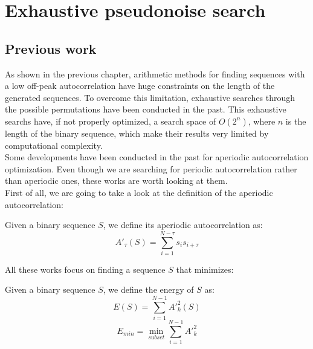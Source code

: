 \chapter{Exhaustive pseudonoise search}
  \section{Previous work}

  As shown in the previous chapter, arithmetic methods for finding sequences
  with a low off-peak autocorrelation have huge constraints on the length of
  the generated sequences. To overcome this limitation, exhaustive searches
  through the possible permutations have been conducted in the past. This
  exhaustive searchs have, if not properly optimized, a search space of
  $O(2^n)$, where $n$ is the length of the binary sequence, which make their
  results very limited by computational complexity.\\

  Some developments have been conducted in the past for aperiodic
  autocorrelation optimization. Even though we are searching for periodic
  autocorrelation rather than aperiodic ones, these works are worth looking
  at them.\\

  First of all, we are going to take a look at the definition of the
  aperiodic autocorrelation:\\
  \begin{definition}
      Given a binary sequence $S$, we define its aperiodic autocorrelation as:
      \begin{equation}
        A'_{\tau}(S) = \sum_{i=1}^{N-\tau}s_{i}s_{i+\tau}
      \end{equation}
  \end{definition}

  All these works focus on finding a sequence $S$ that minimizes:

  \begin{definition} Given a binary sequence $S$, we define the energy of $S$
    as:
    \begin{equation}
      E(S) = \sum_{i=1}^{N-1} A'^{2}_{k}(S)
    \end{equation}
    \begin{equation}
      E_{min} = \operatorname*{min}_{subset} \sum_{i=1}^{N-1} A'^{2}_{k}
    \end{equation}
  \end{definition}

